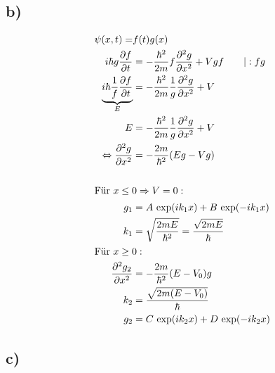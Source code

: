 \subsection{b)}

    \begin{align*}
        \psi(x, t) =& f(t) g(x)\\
        i\hbar g \frac{\partial f}{\partial t} &= -\frac{\hbar^2}{2m} f \frac{\partial^2 g}{\partial x^2} + V g f \qquad \vert :f g\\
        \underbrace{i\hbar \frac{1}{f} \frac{\partial f}{\partial t}}_{E} &= -\frac{\hbar^2}{2m} \frac{1}{g} \frac{\partial^2 g}{\partial x^2} + V\\
        E &= -\frac{\hbar^2}{2m} \frac{1}{g} \frac{\partial^2 g}{\partial x^2} + V\\
        \Leftrightarrow \frac{\partial^2 g}{\partial x^2} &= -\frac{2m}{\hbar^2} (Eg - Vg)\\
        \\
        \intertext{Für $x \leq 0 \Rightarrow V=0:$
        }
        g_1 &= A \, \exp(ik_1x) + B \, \exp(-ik_1x)\\
        k_1 &= \sqrt{\frac{2mE}{\hbar^2}} = \frac{\sqrt{2mE}}{\hbar}\\
        \intertext{Für $x \geq 0:$
        }
        \frac{\partial^2 g_2}{\partial x^2} &= -\frac{2m}{\hbar^2}(E - V_0 )g\\
        k_2 &= \frac{\sqrt{2m(E-V_0)}}{\hbar}\\
        g_2 &= C \, \exp(ik_2x) + D \, \exp(-ik_2x)
    \end{align*}

\subsection{c)}

